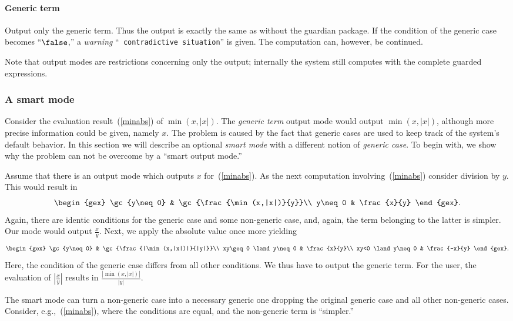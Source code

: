 \paragraph{Generic term} Output only the generic term. Thus the output
is exactly the same as without the guardian package. If the condition
of the generic case becomes ``$\false$,'' a {\em warning} ``{\tt
contradictive situation}'' is given. The computation can, however, be
continued.\bigskip

Note that output modes are restrictions concerning only the output;
internally the system still computes with the complete guarded
expressions.
%
\subsubsection{A smart mode}\label{smartmode}
Consider the evaluation result~(\ref{minabs}) of $\min(x,|x|)$. The
{\em generic term} output mode would output $\min(x,|x|)$, although
more precise information could be given, namely $x$. The problem is
caused by the fact that generic cases are used to keep track of the
system's default behavior. In this section we will describe an
optional {\em smart mode} with a different notion of {\em generic
case}. To begin with, we show why the problem can not be overcome by a
``smart output mode.''

Assume that there is an output mode which outputs $x$
for~(\ref{minabs}). As the next computation involving~(\ref{minabs})
consider division by $y$. This would result in
$$
\begin{gex}
\gc{y\neq0} & \gc{\frac{\min(x,|x|)}{y}}\\
y\neq0 & \frac{x}{y}
\end{gex}.
$$
Again, there are identic conditions for the generic case and some
non-generic case, and, again, the term belonging to the latter is
simpler. Our mode would output $\frac{x}{y}$. Next, we apply the
absolute value once more yielding
$$
\begin{gex}
\gc{y\neq 0} & \gc{\frac{|\min(x,|x|)|}{|y|}}\\
xy\geq0 \land y\neq0 & \frac{x}{y}\\
xy<0 \land y\neq0 & \frac{-x}{y}
\end{gex}.
$$
Here, the condition of the generic case differs from all other
conditions. We thus have to output the generic term. For the user, the
evaluation of $|\frac{x}{y}|$ results in $\frac{|\min(x,|x|)|}{|y|}$.

The smart mode can turn a non-generic case into a necessary generic
one dropping the original generic case and all other non-generic
cases. Consider, e.g.,~(\ref{minabs}), where the conditions are equal,
and the non-generic term is ``simpler.''

